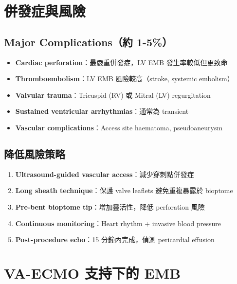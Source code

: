 \documentclass[12pt,a4paper]{article}
\begin{document}
\section{併發症與風險}

\subsection{Major Complications（約 1-5\%）}

\begin{itemize}
    \item \textbf{Cardiac perforation}：最嚴重併發症，LV EMB 發生率較低但更致命
    \item \textbf{Thromboembolism}：LV EMB 風險較高（stroke, systemic embolism）
    \item \textbf{Valvular trauma}：Tricuspid (RV) 或 Mitral (LV) regurgitation
    \item \textbf{Sustained ventricular arrhythmias}：通常為 transient
    \item \textbf{Vascular complications}：Access site haematoma, pseudoaneurysm
\end{itemize}

\subsection{降低風險策略}

\begin{enumerate}
    \item \textbf{Ultrasound-guided vascular access}：減少穿刺點併發症
    \item \textbf{Long sheath technique}：保護 valve leaflets 避免重複暴露於 bioptome
    \item \textbf{Pre-bent bioptome tip}：增加靈活性，降低 perforation 風險
    \item \textbf{Continuous monitoring}：Heart rhythm + invasive blood pressure
    \item \textbf{Post-procedure echo}：15 分鐘內完成，偵測 pericardial effusion
\end{enumerate}

\section{VA-ECMO 支持下的 EMB}
\end{document}
